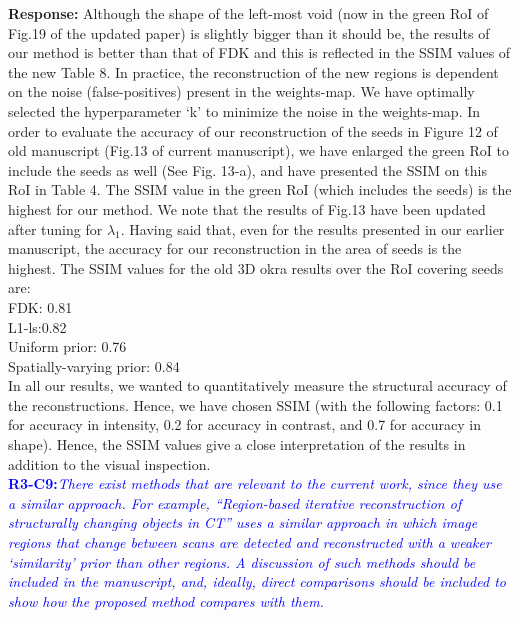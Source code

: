 \documentclass{article}
\begin{document}
\textbf{Response:}  Although the shape of the left-most void (now in the green RoI of Fig.19 of the updated paper) is slightly bigger than it should be, the results of our method is better than that of FDK and this is reflected in the SSIM values of the new Table 8. In practice, the reconstruction of the new regions is dependent on the noise (false-positives) present in the weights-map.  We have optimally selected the hyperparameter `k' to minimize the noise in the weights-map. 
In order to evaluate the accuracy of our reconstruction of the seeds in Figure 12 of old manuscript (Fig.13 of current manuscript), we have enlarged the green RoI to include the seeds as well (See Fig. 13-a), and have presented the SSIM on this RoI in Table 4. The SSIM value in the green RoI (which includes the seeds) is the highest for our method. We note that the results of Fig.13 have been updated after tuning for $\lambda_1$. Having said that, even for the results presented in our earlier manuscript, the accuracy for our reconstruction in the area of seeds is the highest.
The SSIM values for the old 3D okra results over the RoI covering seeds are:\\
FDK: 0.81\\
L1-ls:0.82\\
Uniform prior: 0.76\\
Spatially-varying prior: 0.84 \\
In all our results, we wanted to quantitatively measure the structural accuracy of the reconstructions. Hence, we have chosen SSIM (with the following factors: 0.1 for accuracy in intensity, 0.2 for accuracy in contrast, and 0.7 for accuracy in shape). Hence, the SSIM values give a close interpretation of the results in addition to the visual inspection. \\

\textcolor{blue}{\textbf{R3-C9:}\textit{There exist methods that are relevant to the current work, since they use a similar approach. For example, ``Region-based iterative reconstruction of structurally changing objects in CT'' uses a similar approach in which image regions that change between scans are detected and reconstructed with a weaker `similarity' prior than other regions. A discussion of such methods should be included in the manuscript, and, ideally, direct comparisons should be included to show how the proposed method compares with them.}}
\end{document}
